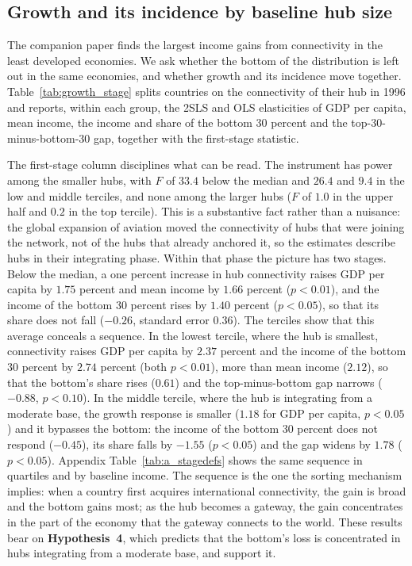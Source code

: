 \subsection{Growth and its incidence by baseline hub size}
\label{sec:growthstage}
The companion paper finds the largest income gains from connectivity in the least developed economies. We ask whether the bottom of the distribution is left out in the same economies, and whether growth and its incidence move together. Table~\ref{tab:growth_stage} splits countries on the connectivity of their hub in 1996 and reports, within each group, the 2SLS and OLS elasticities of GDP per capita, mean income, the income and share of the bottom 30 percent and the top-30-minus-bottom-30 gap, together with the first-stage statistic.



The first-stage column disciplines what can be read. The instrument has power among the smaller hubs, with $F$ of $33.4$ below the median and $26.4$ and $9.4$ in the low and middle terciles, and none among the larger hubs ($F$ of $1.0$ in the upper half and $0.2$ in the top tercile). This is a substantive fact rather than a nuisance: the global expansion of aviation moved the connectivity of hubs that were joining the network, not of the hubs that already anchored it, so the estimates describe hubs in their integrating phase. Within that phase the picture has two stages. Below the median, a one percent increase in hub connectivity raises GDP per capita by $1.75$ percent and mean income by $1.66$ percent ($p<0.01$), and the income of the bottom 30 percent rises by $1.40$ percent ($p<0.05$), so that its share does not fall ($-0.26$, standard error $0.36$). The terciles show that this average conceals a sequence. In the lowest tercile, where the hub is smallest, connectivity raises GDP per capita by $2.37$ percent and the income of the bottom 30 percent by $2.74$ percent (both $p<0.01$), more than mean income ($2.12$), so that the bottom's share rises ($0.61$) and the top-minus-bottom gap narrows ($-0.88$, $p<0.10$). In the middle tercile, where the hub is integrating from a moderate base, the growth response is smaller ($1.18$ for GDP per capita, $p<0.05$) and it bypasses the bottom: the income of the bottom 30 percent does not respond ($-0.45$), its share falls by $-1.55$ ($p<0.05$) and the gap widens by $1.78$ ($p<0.05$). Appendix Table~\ref{tab:a_stagedefs} shows the same sequence in quartiles and by baseline income. The sequence is the one the sorting mechanism implies: when a country first acquires international connectivity, the gain is broad and the bottom gains most; as the hub becomes a gateway, the gain concentrates in the part of the economy that the gateway connects to the world. These results bear on \textbf{Hypothesis~4}, which predicts that the bottom's loss is concentrated in hubs integrating from a moderate base, and support it.

